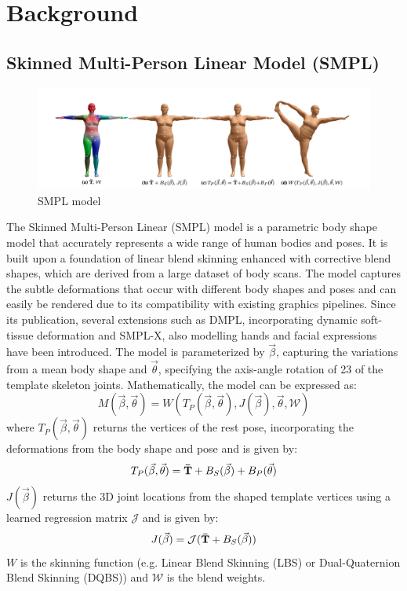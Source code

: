 \chapter{Background} \label{sec:methods}
\section{Skinned Multi-Person Linear Model (SMPL)}
\begin{figure}[h]
    \centering
    \includegraphics[width=\linewidth]{figures/smpl.png}
    \caption{SMPL model}
\end{figure}
The Skinned Multi-Person Linear (SMPL) model is a parametric body shape model that accurately represents a wide range of human bodies and poses. It is built upon a foundation of linear blend skinning enhanced with corrective blend shapes, which are derived from a large dataset of body scans. The model captures the subtle deformations that occur with different body shapes and poses and can easily be rendered due to its compatibility with existing graphics pipelines. Since its publication, several extensions such as DMPL, incorporating dynamic soft-tissue deformation and SMPL-X, also modelling hands and facial expressions have been introduced. The model is parameterized by $\vec{\beta}$, capturing the variations from a mean body shape and $\vec{\theta}$, specifying the axis-angle rotation of 23 of the template skeleton joints. Mathematically, the model can be expressed as:
\begin{equation}
    M(\vec{\beta}, \vec{\theta}) = W(T_P(\vec{\beta}, \vec{\theta}), J(\vec{\beta}), \vec{\theta}, \mathcal{W})
\end{equation}
where $T_P(\vec{\beta}, \vec{\theta})$ returns the vertices of the rest pose, incorporating the deformations from the body shape and pose and is given by:
\begin{equation}
    T_P(\vec{\beta}, \vec{\theta}) = \boldsymbol{\mathbf{\bar{T}}} + B_S(\vec{\beta}) + B_P(\vec{\theta})
\end{equation}
$J(\vec{\beta})$ returns the 3D joint locations from the shaped template vertices using a learned regression matrix $\mathcal{J}$ and is given by:
\begin{equation}
    J(\vec{\beta}) = \mathcal{J}(\boldsymbol{\mathbf{\bar{T}}} + B_S(\vec{\beta}))
\end{equation}
$W$ is the skinning function (e.g. Linear Blend Skinning (LBS) or Dual-Quaternion Blend Skinning (DQBS)) and $\mathcal{W}$ is the blend weights. 


